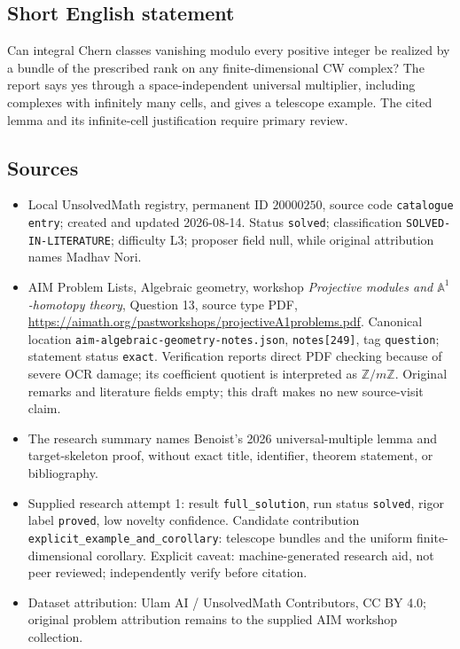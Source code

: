 \documentclass[11pt]{article}
\newcommand{\Z}{\mathbb{Z}}
\newcommand{\A}{\mathbb{A}}
\begin{document}
\subsection{Short English statement}
Can integral Chern classes vanishing modulo every positive integer be realized by a bundle of the prescribed rank on any finite-dimensional CW complex? The report says yes through a space-independent universal multiplier, including complexes with infinitely many cells, and gives a telescope example. The cited lemma and its infinite-cell justification require primary review.
\subsection{Sources}
\begin{itemize}
\item Local UnsolvedMath registry, permanent ID $20000250$, source code \texttt{catalogue entry}; created and updated 2026-08-14. Status \texttt{solved}; classification \texttt{SOLVED-IN-LITERATURE}; difficulty L3; proposer field null, while original attribution names Madhav Nori.
\item AIM Problem Lists, Algebraic geometry, workshop \emph{Projective modules and $\A^1$-homotopy theory}, Question 13, source type PDF, \url{https://aimath.org/pastworkshops/projectiveA1problems.pdf}. Canonical location \texttt{aim-algebraic-geometry-notes.json}, \texttt{notes[249]}, tag \texttt{question}; statement status \texttt{exact}. Verification reports direct PDF checking because of severe OCR damage; its coefficient quotient is interpreted as $\Z/m\Z$. Original remarks and literature fields empty; this draft makes no new source-visit claim.
\item The research summary names Benoist's 2026 universal-multiple lemma and target-skeleton proof, without exact title, identifier, theorem statement, or bibliography.
\item Supplied research attempt 1: result \texttt{full\_solution}, run status \texttt{solved}, rigor label \texttt{proved}, low novelty confidence. Candidate contribution \texttt{explicit\_example\_and\_corollary}: telescope bundles and the uniform finite-dimensional corollary. Explicit caveat: machine-generated research aid, not peer reviewed; independently verify before citation.
\item Dataset attribution: Ulam AI / UnsolvedMath Contributors, CC BY 4.0; original problem attribution remains to the supplied AIM workshop collection.
\end{itemize}
\end{document}
